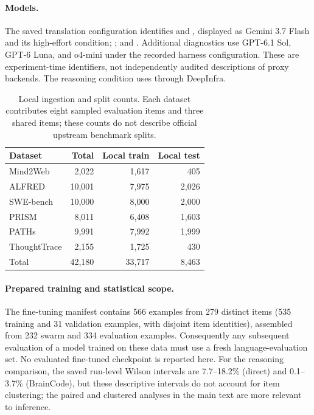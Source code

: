 \documentclass[11pt]{article}
\newcommand{\bc}{BrainCode}
\begin{document}
\paragraph{Models.}
The saved translation configuration identifies  and , displayed as Gemini 3.7 Flash and its high-effort condition; ; and . Additional diagnostics use GPT-6.1 Sol, GPT-6 Luna, and o4-mini under the recorded harness configuration. These are experiment-time identifiers, not independently audited descriptions of proxy backends. The reasoning condition uses  through DeepInfra.

\begin{table}[H]
\centering\small
\begin{tabular}{lrrr}
\toprule
Dataset & Total & Local train & Local test\\\midrule
Mind2Web &2,022&1,617&405\\
ALFRED &10,001&7,975&2,026\\
SWE-bench &10,000&8,000&2,000\\
PRISM &8,011&6,408&1,603\\
PATHs &9,991&7,992&1,999\\
ThoughtTrace &2,155&1,725&430\\\midrule
Total &42,180&33,717&8,463\\
\bottomrule
\end{tabular}
\caption{Local ingestion and split counts. Each dataset contributes eight sampled evaluation items and three shared items; these counts do not describe official upstream benchmark splits.}
\end{table}

\paragraph{Prepared training and statistical scope.}
The fine-tuning manifest contains 566 examples from 279 distinct items (535 training and 31 validation examples, with disjoint item identities), assembled from 232 swarm and 334 evaluation examples. Consequently any subsequent evaluation of a model trained on these data must use a fresh language-evaluation set. No evaluated fine-tuned checkpoint is reported here. For the reasoning comparison, the saved run-level Wilson intervals are 7.7--18.2\% (direct) and 0.1--3.7\% (\bc{}), but these descriptive intervals do not account for item clustering; the paired and clustered analyses in the main text are more relevant to inference.
\end{document}
